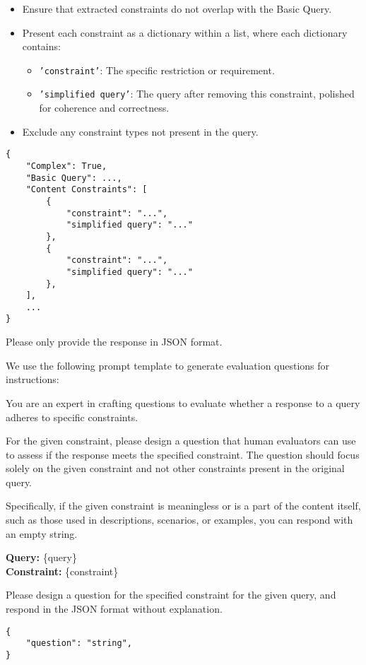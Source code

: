 \begin{tcolorbox}[title = {Prompt Template of Instruction Decomposition}, breakable]
\begin{itemize}
\begin{enumerate}
\begin{itemize}
            \item Ensure that extracted constraints do not overlap with the Basic Query.
            \item Present each constraint as a dictionary within a list, where each dictionary contains:
            \begin{itemize}
                \item \texttt{'constraint'}: The specific restriction or requirement.
                \item \texttt{'simplified query'}: The query after removing this constraint, polished for coherence and correctness.
            \end{itemize}
            \item Exclude any constraint types not present in the query.
        \end{itemize}
    \end{enumerate}
    \end{itemize}

\begin{verbatim}
{
    "Complex": True,
    "Basic Query": ...,
    "Content Constraints": [
        {
            "constraint": "...",
            "simplified query": "..."
        },
        {
            "constraint": "...",
            "simplified query": "..."
        },
    ],
    ...
}
\end{verbatim}
Please only provide the response in JSON format.
\end{tcolorbox}

We use the following prompt template to generate evaluation questions for instructions:
\begin{tcolorbox}[title = {Prompt Template of Eval Question Generation}, breakable]
You are an expert in crafting questions to evaluate whether a response to a query adheres to specific constraints.

For the given constraint, please design a question that human evaluators can use to assess if the response meets the specified constraint. The question should focus solely on the given constraint and not other constraints present in the original query.

Specifically, if the given constraint is meaningless or is a part of the content itself, such as those used in descriptions, scenarios, or examples, you can respond with an empty string.

\textbf{Query:} \{query\} \\
\textbf{Constraint:} \{constraint\}

Please design a question for the specified constraint for the given query, and respond in the JSON format without explanation.

\begin{verbatim}
{
    "question": "string",
}
\end{verbatim}
\end{tcolorbox}

